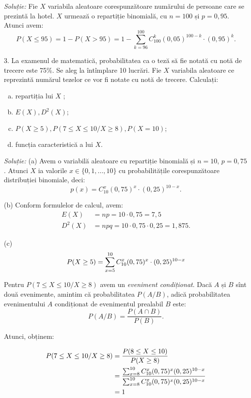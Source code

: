 \emph{Soluție:} Fie $ X $ variabila aleatoare corespunzătoare numărului de persoane
care se prezintă la hotel. $ X $ urmează o repartiție binomială, cu $ n = 100 $ și
$ p = 0,95 $. Atunci avem:
\[
  P(X \leq 95) = 1 - P(X > 95) = %
  1 - \sum_{k = 96}^{100} C_{100}^k (0,05)^{100-k} \cdot (0,95)^k.
\]

\vspace{0.3cm}

3. La examenul de matematică, probabilitatea ca o teză să fie notată cu notă de
trecere este 75\%. Se aleg la întîmplare 10 lucrări. Fie $ X $ variabila aleatoare
ce reprezintă numărul tezelor ce vor fi notate cu notă de trecere. Calculați:
\begin{enumerate}[(a)]
\item repartiția lui $ X $ ;
\item $ E(X), D^2(X) $;
\item $ P(X \geq 5), P(7 \leq X \leq 10 / X \geq 8), P(X = 10) $;
\item funcția caracteristică a lui $ X $.
\end{enumerate}

\emph{Soluție:} (a) Avem o variabilă aleatoare cu repartiție binomială și $ n = 10 $,
$ p = 0,75 $. Atunci $ X $ ia valorile $ x \in \{0, 1, \dots, 10 \}$ cu probabilitățile
corespunzătoare distribuției binomiale, deci:
\[
  p(x) = C_{10}^x (0,75)^x \cdot (0,25)^{10-x}.
\]

(b) Conform formulelor de calcul, avem:
\begin{align*}
  E(X) &= np = 10 \cdot 0,75 = 7,5 \\
  D^2(X) &= npq = 10 \cdot 0,75 \cdot 0,25 = 1,875.
\end{align*}

(c)
\[
  P(X \geq 5) = \displaystyle\sum_{x = 5}^{10} C_{10}^x (0,75)^x \cdot (0,25)^{10-x}
\]

Pentru $ P(7 \leq X \leq 10 / X \geq 8) $ avem un \emph{eveniment condiționat}.
Dacă $ A $ și $ B $ sînt două evenimente, amintim că probabilitatea $ P(A/B) $,
adică probabilitatea evenimentului $ A $ condiționat de evenimentul prealabil $ B $
este:
\[
  P(A / B) = \frac{P(A \cap B)}{P(B)}.
\]

Atunci, obținem:

\begin{align*}
  P(7 \leq X \leq 10 / X \geq 8) &= \dfrac{P(8 \leq X \leq 10)}{P(X \geq 8)} \\
              &= \frac{\sum_{x = 8}^{10} C_{10}^x (0,75)^x (0,25)^{10-x}}{%
                \sum_{x = 8}^{10} C_{10}^x (0,75)^x (0,25)^{10-x}} \\
              &= 1
\end{align*}

